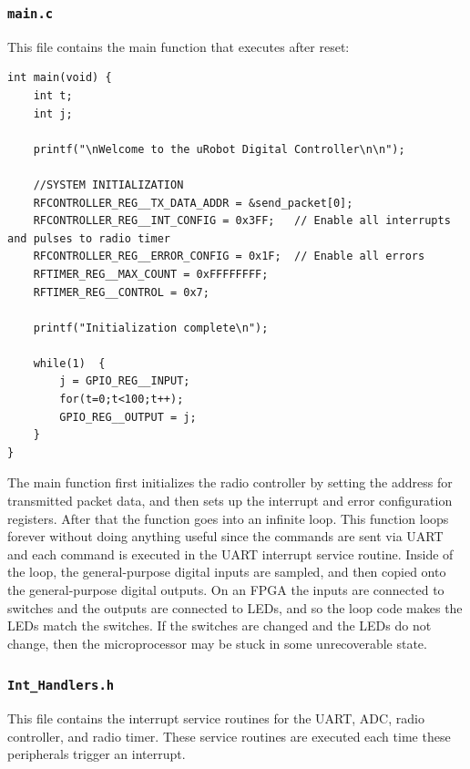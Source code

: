 \subsubsection{\texttt{main.c}}
This file contains the main function that executes after reset:

\begin{lstlisting}
int main(void) {
    int t;	
    int j;

    printf("\nWelcome to the uRobot Digital Controller\n\n"); 

    //SYSTEM INITIALIZATION
    RFCONTROLLER_REG__TX_DATA_ADDR = &send_packet[0];
    RFCONTROLLER_REG__INT_CONFIG = 0x3FF;   // Enable all interrupts and pulses to radio timer
    RFCONTROLLER_REG__ERROR_CONFIG = 0x1F;  // Enable all errors
    RFTIMER_REG__MAX_COUNT = 0xFFFFFFFF;
    RFTIMER_REG__CONTROL = 0x7;

    printf("Initialization complete\n");

    while(1)  {
        j = GPIO_REG__INPUT;
        for(t=0;t<100;t++);
        GPIO_REG__OUTPUT = j;		
    }
}
\end{lstlisting}

The main function first initializes the radio controller by setting the address for transmitted packet data, and then sets up the interrupt and error configuration registers. After that the function goes into an infinite loop. This function loops forever without doing anything useful since the commands are sent via UART and each command is executed in the UART interrupt service routine. Inside of the loop, the general-purpose digital inputs are sampled, and then copied onto the general-purpose digital outputs. On an FPGA the inputs are connected to switches and the outputs are connected to LEDs, and so the loop code makes the LEDs match the switches. If the switches are changed and the LEDs do not change, then the microprocessor may be stuck in some unrecoverable state.

\subsubsection{\texttt{Int\_Handlers.h}}
This file contains the interrupt service routines for the UART, ADC, radio controller, and radio timer. These service routines are executed each time these peripherals trigger an interrupt.


